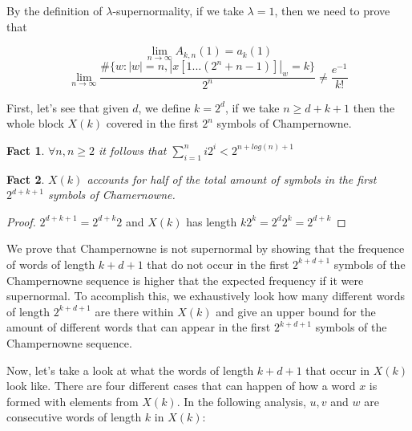 \documentclass[11pt,a4paper,twoside]{tesis}
\newtheorem{fact}{Fact}[section]
\theoremstyle{definition}
\begin{document}
By the definition of $\lambda$-supernormality, if we take $\lambda = 1$, then we need to prove that

$$\lim_{n\to\infty} A_{k,n}(1) = a_k(1)$$
$$\lim_{n\to\infty} \frac{\#\{w: |w| = n  , |x[1...(2^n+n-1)]|_w = k\}}{2^n} \neq \frac{e^{-1}}{k!}$$

\bigskip

First, let's see that given $d$, we define $k = 2^d$, if we take $n \geq d + k + 1$ then the whole block $X(k)$ covered in the first $2^n$ symbols of Champernowne.


\begin{fact}
    $\forall n, n  \geq 2$ it follows that $\sum_{i=1}^n i2^i < 2^{n + log(n) + 1}$ 
\end{fact}

\begin{fact} \label{p2}
    $X(k)$ accounts for half of the total amount of symbols in the first $2^{d+k+1}$ symbols of Chamernowne.
\end{fact}
\begin{proof}
    $2^{d+k+1} = 2^{d+k}2$ and $X(k)$ has length $k2^k = 2^d2^k = 2^{d+k}$ 
\end{proof}

We prove that Champernowne is not supernormal by showing that the frequence of words of length $k+d+1$ that do not occur in the first $2^{k+d+1}$ symbols of the Champernowne sequence is higher that the expected frequency if it were supernormal.
To accomplish this, we exhaustively look how many different words of length $2^{k+d+1}$ are there within $X(k)$ and give an upper bound for the amount of different words that can appear in the first $2^{k+d+1}$ symbols of the Champernowne sequence.

Now, let's take a look at what the words of length $k + d + 1$ that occur in $X(k)$ look like. There are four different cases that can happen of how a word $x$ is formed with elements from $X(k)$. 
In the following analysis, $u, v$ and $w$ are consecutive words of length $k$ in $X(k)$:


\end{document}
